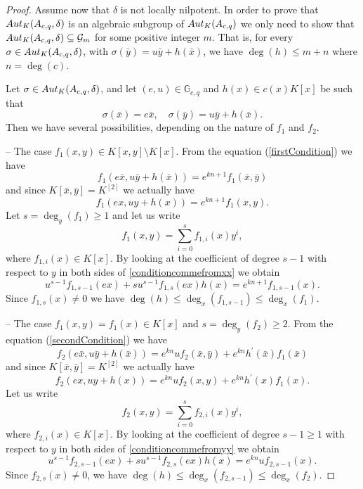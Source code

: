 \documentclass[10pt,a4paper]{amsart}
\newcommand \G {\mathbb{G}}
\newcommand \auto {{\rm Aut}}
\renewcommand \a {A}
\renewcommand \k {K}
\begin{document}
\begin{proof}
	\medskip Assume now that $\delta$ is not locally nilpotent. In order to prove that $\auto_{\k}(\a_{c,q},\delta)$ is an algebraic subgroup of $\auto_{\k}(\a_{c,q})$ we only need to show that $\auto_{\k}(\a_{c,q},\delta)\subseteq \mathcal{G}_m$ for some positive integer $m$. That is, for every $\sigma\in\auto_{\k}(\a_{c,q},\delta)$, with $\sigma(\bar{y})=u\bar{y}+h(\bar{x})$, we have $\deg(h)\leq m+n$ where $n=\deg(c)$.
	
	\medskip Let $\sigma\in\auto_{\k}(\a_{c,q},\delta)$, and let $(e,u)\in \G_{c,q}$ and $h(x)\in c(x)\k[x]$ be such that $$\sigma(\bar{x})=e\bar{x},\quad \sigma(\bar{y})=u\bar{y}+h(\bar{x}).$$ Then we have several possibilities, depending on the nature of $f_1$ and $f_2$.
	
	\medskip -- The case $f_1(x,y)\in K[x,y] \setminus \k[x]$. From the equation (\ref{firstCondition}) we have
	$$	f_1(e\bar{x},u\bar{y}+h(\bar{x}))= e^{kn+1} f_1(\bar{x}, \bar{y})$$
	and since $\k[\bar{x},\bar{y}]=K^{[2]}$ we actually have \begin{equation}\label{conditioncommefromxx} f_1(ex,uy+h(x))=e^{kn+1}f_1(x,y).\end{equation}
	Let $s = \deg_y(f_1) \geq 1$ and let us write $$ f_1(x, y) = \sum_{i=0}^{s} f_{1,i}(x) y^i,$$ where $ f_{1,i}(x) \in \k[x]$.
	By looking at the coefficient of  degree $s-1$ with respect to $y$ in both sides of \eqref{conditioncommefromxx}
	we obtain $$u^{s-1} f_{1,s-1}(ex)+su^{s-1} f_{1,s}(ex)h(x)=e^{kn+1}f_{1,s-1}(x).$$ Since $f_{1,s}(x)\neq0$ we have $\deg(h)\leq \deg_{x}(f_{1,s-1})\leq \deg_{x}(f_{1})$.
	
	\medskip -- The case $f_1(x,y)=f_1(x)\in\k[x]$ and $s=\deg_y(f_2)\geq 2$. From the equation (\ref{secondCondition}) we have 
	$$f_2(e\bar{x},u\bar{y}+h(\bar{x}))=e^{kn}u f_2(\bar{x},\bar{y}) + e^{kn}h^{\prime}(\bar{x})f_1(\bar{x})$$
	and since $\k[\bar{x},\bar{y}]=\k^{[2]}$ we actually have \begin{equation}\label{conditioncommefromyy} f_2(ex,uy+h(x))=e^{kn}u f_2(x, y)+e^{kn} h^{\prime}(x)f_1(x).\end{equation}
	Let us write $$ f_2(x, y) = \sum_{i=0}^{s} f_{2,i}(x) y^i,
	$$ where $ f_{2,i}(x) \in \k[x]$. By looking at the coefficient of  degree $s-1\geq 1$ with respect to $y$ in both sides of \eqref{conditioncommefromyy}
	we obtain $$u^{s-1} f_{2,s-1}(ex)+su^{s-1} f_{2,s}(ex)h(x)=e^{kn}uf_{2,s-1}(x).$$ Since $f_{2,s}(x)\neq0$, we have $\deg(h)\leq \deg_{x}(f_{2,s-1})\leq \deg_{x}(f_{2})$.
	

\end{proof}
\end{document}
